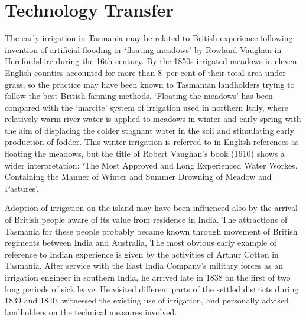\section*{Technology Transfer}

The early irrigation in Tasmania may be related to
British experience following invention of artificial
flooding or `floating meadows' by Rowland
Vaughan  in Herefordshire during the 16th century.
By the 1850s irrigated meadows in eleven English counties accounted
for more than 8~per cent of their total area under grass, so the
practice may have been known to Tasmanian landholders trying to follow
the best British farming methods.  `Floating the meadows' has been
compared with the `marcite' system of irrigation used in northern
Italy, where relatively warm river water is applied to
meadows in winter and early spring with the aim of displacing the
colder stagnant water in the soil and stimulating early production of
fodder.  This winter irrigation is referred to in
English references as floating the meadows, but the title of Robert
Vaughan's book (1610) shows a wider interpretation: `The Most Approved
and Long Experienced Water Workes.  Containing the Manner of Winter
and Summer Drowning of Meadow and
Pastures'.

Adoption of irrigation on the island may have been influenced also by
the arrival of British people aware of its value from residence in
India.  The attractions of Tasmania for these people probably became
known through movement of British regiments between India
and Australia, The most obvious early example of reference to Indian
experience is given by the activities of Arthur Cotton in Tasmania.  After service with the East India Company's military
forces as an irrigation engineer in southern India, he arrived late in
1838 on the first of two long periods of sick leave.  He visited
different parts of the settled districts during 1839 and 1840,
witnessed the existing use of irrigation, and personally advised
landholders on the technical measures
involved.

